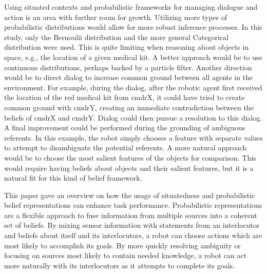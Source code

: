 \documentclass[12pt]{article}
\begin{document}
Using situated contexts and probabilistic frameworks for managing
dialogue and action is an area with further room for growth.
Utilizing more types of probabilistic distributions would allow for
more robust inference processes. In this study, only the Bernoulii
distribution and the more general Categorical distribution were
used. This is quite limiting when reasoning about objects in space,
e.g., the location of a given medical kit. A better approach would be
to use continuous distributions, perhaps backed by a particle filter.
Another direction would be to direct dialog to increase common ground
between all agents in the environment. For example, during the dialog,
after the robotic agent first received the location of the red medical
kit from cmdrX, it could have tried to create common ground with
cmdrY, creating an immediate contradiction between the beliefs of
cmdrX and cmdrY. Dialog could then pursue a resolution to this
dialog. A final improvement could be performed during the grounding of
ambiguous referents. In this example, the robot simply chooses a
feature with separate values to attempt to disambiguate the potential
referents. A more natural approach would be to choose the most salient
features of the objects for comparison. This would require having
beliefs about objects and their salient features, but it is a natural
fit for this kind of belief framework.

This paper gave an overview on how the usage of situatedness and
probabilistic belief representations can enhance task
performance. Probabilistic representations are a flexible approach to
fuse information from multiple sources into a coherent set of
beliefs. By mixing sensor information with statements from an
interlocutor and beliefs about itself and its interlocutors, a robot
can choose actions which are most likely to accomplish its goals. By
more quickly resolving ambiguity or focusing on sources most likely to
contain needed knowledge, a robot can act more naturally with its
interlocutors as it attempts to complete its goals.

{\small }
\end{document}
